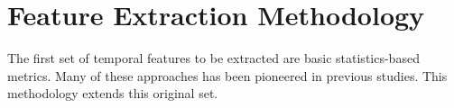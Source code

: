\section{Feature Extraction Methodology}
\label{sec:statsfeatures}

The first set of temporal features to be extracted are basic statistics-based metrics. Many of these approaches has been pioneered in previous studies. This methodology extends this original set.

